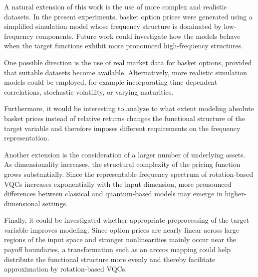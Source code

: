 A natural extension of this work is the use of more complex and
realistic datasets. In the present experiments, basket option
prices were generated using a simplified simulation model whose
frequency structure is dominated by low-frequency components.
Future work could investigate how the models behave when the
target functions exhibit more pronounced high-frequency
structures.

One possible direction is the use of real market data for basket
options, provided that suitable datasets become available.
Alternatively, more realistic simulation models could be
employed, for example incorporating time-dependent correlations,
stochastic volatility, or varying maturities.

Furthermore, it would be interesting to analyze to what extent
modeling absolute basket prices instead of relative returns
changes the functional structure of the target variable and
therefore imposes different requirements on the frequency
representation.

Another extension is the consideration of a larger number of
underlying assets. As dimensionality increases, the structural
complexity of the pricing function grows substantially. Since
the representable frequency spectrum of rotation-based VQCs
increases exponentially with the input dimension, more
pronounced differences between classical and quantum-based
models may emerge in higher-dimensional settings.

Finally, it could be investigated whether appropriate
preprocessing of the target variable improves modeling.
Since option prices are nearly linear across large regions of
the input space and stronger nonlinearities mainly occur near
the payoff boundaries, a transformation such as an arccos
mapping could help distribute the functional structure more
evenly and thereby facilitate approximation by rotation-based
VQCs.